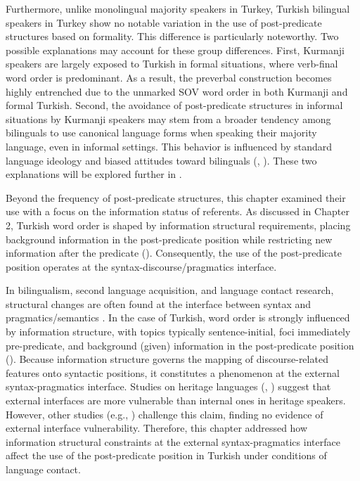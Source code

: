 Furthermore, unlike monolingual majority speakers in Turkey, Turkish bilingual speakers in Turkey show no notable variation in the use of post-predicate structures based on formality. This difference is particularly noteworthy. Two possible explanations may account for these group differences. First, Kurmanji speakers are largely exposed to Turkish in formal situations, where verb-final word order is predominant. As a result, the preverbal construction becomes highly entrenched due to the unmarked SOV word order in both Kurmanji and formal Turkish. Second, the avoidance of post-predicate structures in informal situations by Kurmanji speakers may stem from a broader tendency among bilinguals to use canonical language forms when speaking their majority language, even in informal settings. This behavior is influenced by standard language ideology and biased attitudes toward bilinguals (\citealt{SevincDewaele2018}, \citealt{Bunk2024, bunk_anxious_2025}). These two explanations will be explored further in .

Beyond the frequency of post-predicate structures, this chapter examined their use with a focus on the information status of referents. As discussed in Chapter 2, Turkish word order is shaped by information structural requirements, placing background information in the post-predicate position while restricting new information after the predicate (\citealt{Erguvanli1984, Issever2003}). Consequently, the use of the post-predicate position operates at the syntax-discourse/pragmatics interface.

In bilingualism, second language acquisition, and language contact research, structural changes are often found at the interface between syntax and pragmatics/semantics \citep{Sorace2011}. In the case of Turkish, word order is strongly influenced by information structure, with topics typically sentence-initial, foci immediately pre-predicate, and background (given) information in the post-predicate position (\citealt{Erguvanli1984, Issever2003}). Because information structure governs the mapping of discourse-related features onto syntactic positions, it constitutes a phenomenon at the external syntax-pragmatics interface. Studies on heritage languages (\citealt{MontrulPolinsky2011}, \citealt{PascualEtAl2012}) suggest that external interfaces are more vulnerable than internal ones in heritage speakers. However, other studies (e.g., \citealt{Gondra2022, martynova2024ov}) challenge this claim, finding no evidence of external interface vulnerability. Therefore, this chapter addressed how information structural constraints at the external syntax-pragmatics interface affect the use of the post-predicate position in Turkish under conditions of language contact.

